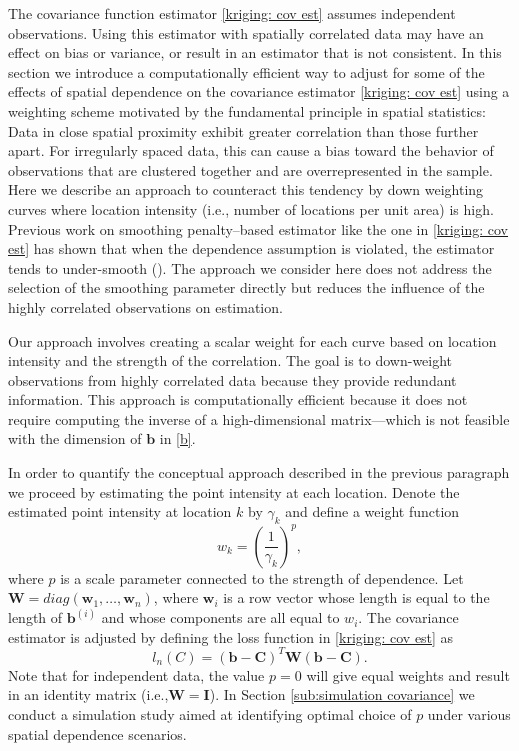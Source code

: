 The covariance function estimator \eqref{kriging: cov est} assumes independent observations. Using this estimator with spatially correlated data may have an effect on bias or variance, or result in an estimator that is not consistent. In this section we introduce a computationally efficient way to adjust for some of the effects of spatial dependence on the covariance estimator \ref{kriging: cov est} using a weighting scheme motivated by the fundamental principle in spatial statistics: Data in close spatial proximity exhibit greater correlation than those further apart. For irregularly spaced data, this can cause a bias toward the behavior of observations that are clustered together and are overrepresented in the sample. Here we describe an approach to counteract this tendency by down weighting curves where location intensity (i.e., number of locations per unit area) is high. Previous work on smoothing penalty--based estimator like the one in \eqref{kriging: cov est} has shown that when the dependence assumption is violated, the estimator tends to under-smooth (\cite{Wang:1998tq}). The approach we consider here does not address the selection of the smoothing parameter directly but reduces the influence of the highly correlated observations on estimation. 

Our approach involves creating a scalar weight for each curve based on location intensity and the strength of the correlation. The goal is to down-weight observations from highly correlated data because they provide redundant information. This approach is computationally efficient because it does not require computing the inverse of a high-dimensional matrix---which is not feasible with the dimension of $\mathbf{b}$ in \eqref{b}.  

In order to quantify the conceptual approach described in the previous paragraph we proceed by estimating the point intensity at each location. Denote the estimated point intensity at location $k$ by $\gamma_k$ and define a weight function 
\begin{equation}
	w_k = \left(\frac{1}{\gamma_k}\right)^p, 
\end{equation}
where $p$ is a scale parameter connected to the strength of dependence.
Let $\mathbf{W}=diag(\mathbf{w}_1, \dots, \mathbf{w}_n)$, where $\mathbf{w}_i$ is a row vector whose length is equal to the length of $\mathbf{b}^{(i)}$ and whose components are all equal to $w_i$. The covariance estimator is adjusted by defining the loss function in \eqref{kriging: cov est} as 
\begin{equation}
	l_{n}(C)= (\mathbf{b} - \mathbf{C})^T\mathbf{W}(\mathbf{b} - \mathbf{C}). \label{eq:diag weighted loss function} 
\end{equation}
Note that for independent data, the value $p = 0$ will give equal weights and result in an identity matrix (i.e.,$\mathbf{W} = \mathbf{I}$). In Section \ref{sub:simulation covariance} we conduct a simulation study aimed at identifying optimal choice of $p$ under various spatial dependence scenarios. 

